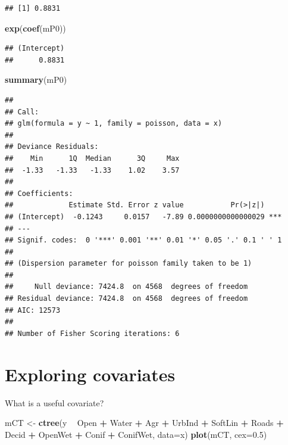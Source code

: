 \documentclass[12pt,]{book}
\newenvironment{Shaded}{\begin{snugshade}}{\end{snugshade}}
\newcommand{\DataTypeTok}[1]{\textcolor[rgb]{0.13,0.29,0.53}{#1}}
\newcommand{\FloatTok}[1]{\textcolor[rgb]{0.00,0.00,0.81}{#1}}
\newcommand{\KeywordTok}[1]{\textcolor[rgb]{0.13,0.29,0.53}{\textbf{#1}}}
\newcommand{\NormalTok}[1]{#1}
\newcommand{\OperatorTok}[1]{\textcolor[rgb]{0.81,0.36,0.00}{\textbf{#1}}}
\newcommand{\StringTok}[1]{\textcolor[rgb]{0.31,0.60,0.02}{#1}}
\begin{document}
\begin{verbatim}
## [1] 0.8831
\end{verbatim}

\begin{Shaded}
\begin{Highlighting}[]
\KeywordTok{exp}\NormalTok{(}\KeywordTok{coef}\NormalTok{(mP0))}
\end{Highlighting}
\end{Shaded}

\begin{verbatim}
## (Intercept) 
##      0.8831
\end{verbatim}

\begin{Shaded}
\begin{Highlighting}[]
\KeywordTok{summary}\NormalTok{(mP0)}
\end{Highlighting}
\end{Shaded}

\begin{verbatim}
## 
## Call:
## glm(formula = y ~ 1, family = poisson, data = x)
## 
## Deviance Residuals: 
##    Min      1Q  Median      3Q     Max  
##  -1.33   -1.33   -1.33    1.02    3.57  
## 
## Coefficients:
##             Estimate Std. Error z value           Pr(>|z|)    
## (Intercept)  -0.1243     0.0157   -7.89 0.0000000000000029 ***
## ---
## Signif. codes:  0 '***' 0.001 '**' 0.01 '*' 0.05 '.' 0.1 ' ' 1
## 
## (Dispersion parameter for poisson family taken to be 1)
## 
##     Null deviance: 7424.8  on 4568  degrees of freedom
## Residual deviance: 7424.8  on 4568  degrees of freedom
## AIC: 12573
## 
## Number of Fisher Scoring iterations: 6
\end{verbatim}

\hypertarget{exploring-covariates}{%
\section{Exploring covariates}\label{exploring-covariates}}

What is a useful covariate?

\begin{Shaded}
\begin{Highlighting}[]
\NormalTok{mCT <-}\StringTok{ }\KeywordTok{ctree}\NormalTok{(y }\OperatorTok{~}\StringTok{ }\NormalTok{Open }\OperatorTok{+}\StringTok{ }\NormalTok{Water }\OperatorTok{+}\StringTok{ }\NormalTok{Agr }\OperatorTok{+}\StringTok{ }\NormalTok{UrbInd }\OperatorTok{+}\StringTok{ }\NormalTok{SoftLin }\OperatorTok{+}\StringTok{ }\NormalTok{Roads }\OperatorTok{+}\StringTok{ }
\StringTok{  }\NormalTok{Decid }\OperatorTok{+}\StringTok{ }\NormalTok{OpenWet }\OperatorTok{+}\StringTok{ }\NormalTok{Conif }\OperatorTok{+}\StringTok{ }\NormalTok{ConifWet, }\DataTypeTok{data=}\NormalTok{x)}
\KeywordTok{plot}\NormalTok{(mCT, }\DataTypeTok{cex=}\FloatTok{0.5}\NormalTok{)}
\end{Highlighting}
\end{Shaded}
\end{document}
